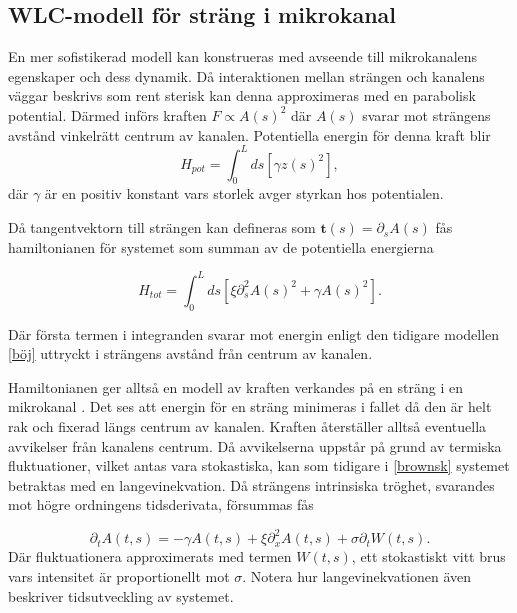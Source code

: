 \subsection{WLC-modell för sträng i mikrokanal}

En mer sofistikerad modell kan konstrueras med avseende till mikrokanalens egenskaper och dess dynamik. Då interaktionen mellan strängen och kanalens väggar beskrivs som rent sterisk \cite{Koster_etal2007} kan denna approximeras med en parabolisk potential. Därmed införs kraften $F \propto A(s)^2$ där $A(s)$ svarar mot strängens avstånd vinkelrätt centrum av kanalen. Potentiella energin för denna kraft blir
\begin{equation}
    H_{pot}=\int_{0}^{L} ds[\gamma z(s)^2],
\end{equation}
där $\gamma$ är en positiv konstant vars storlek avger styrkan hos potentialen. 

Då tangentvektorn till strängen kan defineras som $\mathbf{t}(s)=\partial_sA(s)$ fås hamiltonianen för systemet som summan av de potentiella energierna

\begin{equation}
\label{Htot}
    H_{tot}=\int_{0}^{L}ds[\xi\partial_{s}^{2}A(s)^2 + \gamma A(s)^2].
\end{equation}

Där första termen i integranden svarar mot energin enligt den tidigare modellen \eqref{böj} uttryckt i strängens avstånd från centrum av kanalen.

Hamiltonianen ger alltså en modell av kraften verkandes på en sträng i en mikrokanal . Det ses att energin för en sträng minimeras i fallet då den är helt rak och fixerad längs centrum av kanalen. Kraften återställer alltså eventuella avvikelser från kanalens centrum. Då avvikelserna uppstår på grund av termiska fluktuationer, vilket antas vara stokastiska, kan som tidigare i \ref{brownsk} systemet betraktas med en langevinekvation. Då strängens intrinsiska tröghet, svarandes mot högre ordningens tidsderivata, försummas fås\cite{PhysRevE.60.4671}

\begin{equation}
\label{mans}
    \partial_{t}A(t,s)=-\gamma A(t,s)+\xi \partial_{x}^{2}A(t,s)+\sigma \partial_{t}W(t,s).
\end{equation}
Där fluktuationera approximerats med termen $W(t,s)$, ett stokastiskt vitt brus vars intensitet är proportionellt mot $\sigma$. Notera hur langevinekvationen även beskriver tidsutveckling av systemet.

